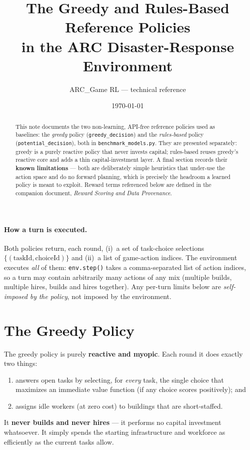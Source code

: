 \documentclass[11pt]{article}
\title{\textbf{The Greedy and Rules-Based Reference Policies\\ in the ARC Disaster-Response Environment}}
\author{ARC\_Game RL --- technical reference}
\date{\today}
\newcommand{\py}[1]{{\color{pyorange}\texttt{\small #1}}}
\begin{document}
\maketitle

\begin{abstract}
\noindent This note documents the two non-learning, API-free reference policies used as baselines:
the \emph{greedy} policy (\py{greedy\_decision}) and the \emph{rules-based} policy
(\py{potential\_decision}), both in \py{benchmark\_models.py}. They are presented separately:
greedy is a purely reactive policy that never invests capital; rules-based reuses greedy's reactive
core and adds a thin capital-investment layer. A final section records their \textbf{known
limitations} --- both are deliberately simple heuristics that under-use the action space and do no
forward planning, which is precisely the headroom a learned policy is meant to exploit. Reward
terms referenced below are defined in the companion document, \emph{Reward Scoring and Data
Provenance}.
\end{abstract}

\tableofcontents
\vspace{1em}

\paragraph{How a turn is executed.} Both policies return, each round, (i)~a set of task-choice
selections $\{(\text{taskId}, \text{choiceId})\}$ and (ii)~a list of game-action indices. The
environment executes \emph{all} of them: \py{env.step()} takes a comma-separated list of action
indices, so a turn may contain arbitrarily many actions of any mix (multiple builds, multiple
hires, builds and hires together). Any per-turn limits below are \emph{self-imposed by the policy},
not imposed by the environment.

\section{The Greedy Policy}

The greedy policy is purely \textbf{reactive and myopic}. Each round it does exactly two things:
\begin{enumerate}[leftmargin=1.5em, itemsep=1pt]
\item answers open tasks by selecting, for \emph{every} task, the single choice that maximizes an
immediate value function (if any choice scores positively); and
\item assigns idle workers (at zero cost) to buildings that are short-staffed.
\end{enumerate}
It \textbf{never builds and never hires} --- it performs no capital investment whatsoever. It
simply spends the starting infrastructure and workforce as efficiently as the current tasks allow.
\end{document}

